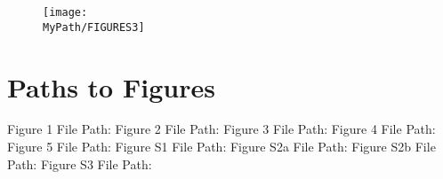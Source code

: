 \documentclass[12pt]{article}
\newcommand*{\MyPath}{..}
\begin{document}
\begin{figure}
  \texttt{[image: \\MyPath/FIGURES3]}
  \caption{\protect}
  \label{fig:figS3}
\end{figure}

\clearpage
\section{Paths to Figures}
Figure 1 File Path: {\tiny\texttt{}}
Figure 2 File Path: {\tiny\texttt{}}
Figure 3 File Path: {\tiny\texttt{}}
Figure 4 File Path: {\tiny\texttt{}}
Figure 5 File Path: {\tiny\texttt{}}
Figure S1 File Path: {\tiny\texttt{}}
Figure S2a File Path: {\tiny\texttt{}}
Figure S2b File Path: {\tiny\texttt{}}
Figure S3 File Path: {\tiny\texttt{}}
\end{document}
